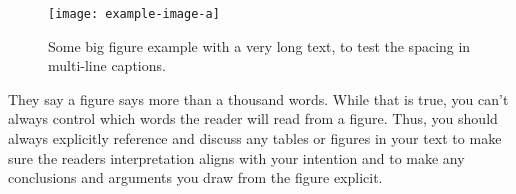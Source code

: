 \begin{figure}
    \centering
      \texttt{[image: example-image-a]}
      \caption{Some big figure example with a very long text, to test the spacing in multi-line captions.}
      \label{figure:example_figure}
    \end{figure}

They say a figure says more than a thousand words. While that is true, you can't always control which words the reader will read from a figure. Thus, you should always explicitly reference and discuss any tables or figures in your text to make sure the readers interpretation aligns with your intention and to make any conclusions and arguments you draw from the figure explicit.

